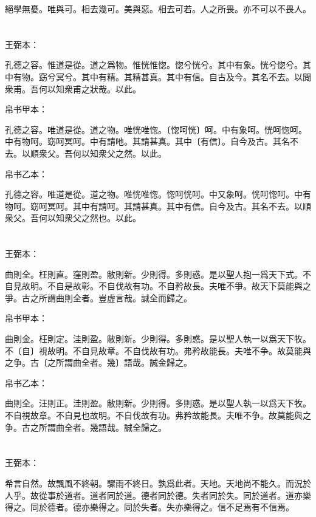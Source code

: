 \documentclass[a5paper]{ctexbook}
\begin{document}
    絕學無憂。唯與可。相去幾可。美與惡。相去可若。人之所畏。亦不可以不畏人。

    \chapter{}
    王弼本：

    孔德之容。惟道是從。道之爲物。惟恍惟惚。惚兮恍兮。其中有象。恍兮惚兮。其中有物。窈兮冥兮。其中有精。其精甚真。其中有信。自古及今。其名不去。以閲衆甫。吾何以知衆甫之狀哉。以此。

    
    帛书甲本：

    孔德之容。唯道是從。道之物。唯恍唯惚。〔惚呵恍〕呵。中有象呵。恍呵惚呵。中有物呵。窈呵冥呵。中有請吔。其請甚真。其中〔有信〕。自今及古。其名不去。以順衆父。吾何以知衆父之然。以此。

    帛书乙本：

    孔德之容。唯道是從。道之物。唯恍唯惚。惚呵恍呵。中又象呵。恍呵惚呵。中有物呵。窈呵冥呵。其中有請呵。其請甚真。其中有信。自今及古。其名不去。以順衆父。吾何以知衆父之然也。以此。

    \chapter{}
    王弼本：

    曲則全。枉則直。窪則盈。敝則新。少則得。多則惑。是以聖人抱一爲天下式。不自見故明。不自是故彰。不自伐故有功。不自矜故長。夫唯不爭。故天下莫能與之爭。古之所謂曲則全者。豈虚言哉。誠全而歸之。

    
    帛书甲本：

    曲則金。枉則定。洼則盈。敝則新。少則得。多則惑。是以聖人執一以爲天下牧。不〔自〕視故明。不自見故章。不自伐故有功。弗矜故能長。夫唯不争。故莫能與之争。古〔之所謂曲全者。幾〕語哉。誠金歸之。

    帛书乙本：

    曲則全。汪則正。洼則盈。敝則新。少則得。多則惑。是以聖人執一以爲天下牧。不自視故章。不自見也故明。不自伐故有功。弗矜故能長。夫唯不争。故莫能與之争。古之所謂曲全者。幾語哉。誠全歸之。

    \chapter{}
    王弼本：

    希言自然。故飄風不終朝。驟雨不終日。孰爲此者。天地。天地尚不能久。而況於人乎。故從事於道者。道者同於道。德者同於德。失者同於失。同於道者。道亦樂得之。同於德者。德亦樂得之。同於失者。失亦樂得之。信不足焉有不信焉。
\end{document}
